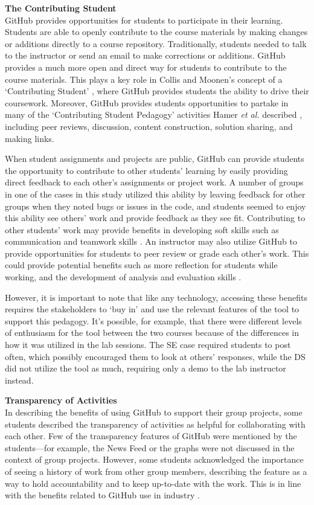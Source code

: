 \textbf{The Contributing Student} \\
GitHub provides opportunities for students to participate in their learning. Students are able to openly contribute to the course materials by making changes or additions directly to a course repository. Traditionally, students needed to talk to the instructor or send an email to make corrections or additions. GitHub provides a much more open and direct way for students to contribute to the course materials. This plays a key role in Collis and Moonen's concept of a `Contributing Student' \cite{collis2006contributing}, where GitHub provides students the ability to drive their coursework. Moreover, GitHub provides students opportunities to partake in many of the `Contributing Student Pedagogy' activities Hamer \textit{et al.} described \cite{hamer2011tools}, including peer reviews, discussion, content construction, solution sharing, and making links.

When student assignments and projects are public, GitHub can provide students the opportunity to contribute to other students' learning by easily providing direct feedback to each other's assignments or project work. A number of groups in one of the cases in this study utilized this ability by leaving feedback for other groups when they noted bugs or issues in the code, and students seemed to enjoy this ability see others' work and provide feedback as they see fit. Contributing to other students' work may provide benefits in developing soft skills such as communication and teamwork skills \cite{hamer2006some}. An instructor may also utilize GitHub to provide opportunities for students to peer review or grade each other's work. This could provide potential benefits such as more reflection for students while working, and the development of analysis and evaluation skills \cite{sondergaard2012collaborative}.

However, it is important to note that like any technology, accessing these benefits requires the stakeholders to `buy in' and use the relevant features of the tool to support this pedagogy. It's possible, for example, that there were different levels of enthusiasm for the tool between the two courses because of the differences in how it was utilized in the lab sessions. The SE case required students to post often, which possibly encouraged them to look at others' responses, while the DS did not utilize the tool as much, requiring only a demo to the lab instructor instead.

\textbf{Transparency of Activities} \\
In describing the benefits of using GitHub to support their group projects, some students described the transparency of activities as helpful for collaborating with each other. Few of the transparency features of GitHub were mentioned by the students---for example, the News Feed or the graphs were not discussed in the context of group projects. However, some students acknowledged the importance of seeing a history of work from other group members, describing the feature as a way to hold accountability and to keep up-to-date with the work. This is in line with the benefits related to GitHub use in industry \cite{dabbish2012social}.

